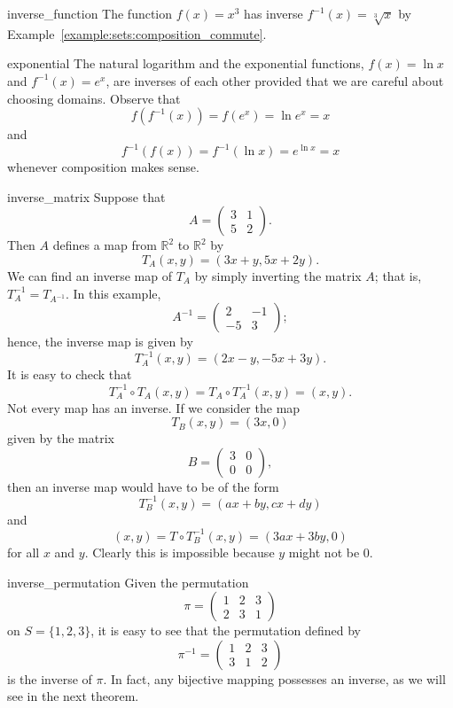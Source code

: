 \begin{example}{inverse_function}
The function $f(x) = x^3$ has inverse $f^{-1}(x) = \sqrt[3]{x}$ by Example~\ref{example:sets:composition_commute}. \mbox{\hspace{1in}}
\end{example}

\begin{example}{exponential}
The natural logarithm and the exponential functions, $f(x) = \ln x$ and $f^{-1}(x) = e^x$, are inverses of each other provided that we are careful about choosing domains.  Observe that  
$$
f(f^{-1}(x)) = f(e^x) = \ln e^x = x
$$
and
$$
f^{-1}(f(x)) = f^{-1}(\ln x) = e^{\ln x} = x
$$
whenever composition makes sense.
\end{example}

\begin{example}{inverse_matrix}
Suppose that
$$
A =
\begin{pmatrix}
3 & 1 \\
5 & 2
\end{pmatrix}.
$$
Then $A$ defines a map from ${\mathbb R}^2$ to ${\mathbb R}^2$ by
$$
T_A (x,y) = (3x +  y, 5x +2y).
$$
We can find an inverse map of $T_A$ by simply inverting the matrix $A$; that is, $T_A^{-1} = T_{A^{-1}}$. In this example,
$$
A^{-1} =
\begin{pmatrix}
2  & -1 \\
-5 &  3
\end{pmatrix};
$$
hence, the inverse map is given by
$$
T_A^{-1} (x,y) = (2x -  y, -5x + 3y).
$$
It is easy to check that
$$
T^{-1}_A \circ T_A (x,y) = T_A \circ T_A^{-1} (x,y) = (x,y).
$$
Not every map has an inverse.  If we consider the map
$$
T_B (x,y) = (3x , 0 )
$$
given by the matrix
$$
B =
\begin{pmatrix}
3 & 0 \\
0 & 0
\end{pmatrix},
$$
then an inverse map would have to be of the form
$$
T_B^{-1} (x,y) = (ax + by, cx +dy)
$$
and
$$
(x,y) = T \circ T_B^{-1} (x,y) = (3ax + 3by, 0)
$$
for all $x$ and $y$.  Clearly this is  impossible because $y$ might not be 0. 
\end{example}

\begin{example}{inverse_permutation}
Given the permutation
$$
\pi =
\begin{pmatrix}
1 & 2 & 3 \\
2 & 3 & 1
\end{pmatrix}
$$
on $S = \{ 1,2,3 \}$, it is easy to see that the permutation defined by
$$
\pi^{-1} =
\begin{pmatrix}
1 & 2 & 3 \\
3 & 1 & 2
\end{pmatrix}
$$
is the inverse of $\pi$.  In fact, any bijective mapping possesses an inverse, as we will see in the next theorem.
\end{example}
 
